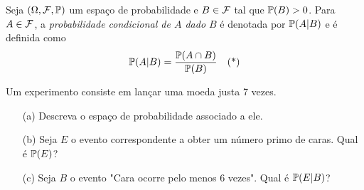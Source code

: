 \begin{definition}
Seja $(\Omega,\mathcal F,\mathbb{P})$ um espaço de probabilidade e $B \in \mathcal F$ tal que $\mathbb{P}(B)>0$. Para $A \in \mathcal F$, a \emph{probabilidade condicional de $A$ dado $B$} é denotada por $\mathbb{P}(A|B)$ e é definida como
\begin{equation}
\mathbb{P}(A|B) = \frac{\mathbb{P}(A \cap B)}{\mathbb{P}(B)} \quad \text{(*)}
\end{equation}
\end{definition}


\begin{exercise}
Um experimento consiste em lançar uma moeda justa 7 vezes.
\begin{itemize}[noitemsep]
\item[(a)] Descreva o espaço de probabilidade associado a ele.
\item[(b)] Seja $E$ o evento correspondente a obter um número primo de caras. Qual é $\mathbb{P}(E)$?
\item[(c)] Seja $B$ o evento "Cara ocorre pelo menos 6 vezes". Qual é $\mathbb{P}(E|B)$?
\end{itemize}
\end{exercise}

